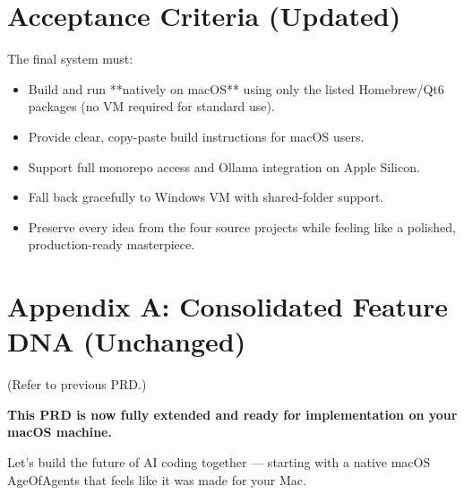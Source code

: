 \documentclass[11pt,a4paper]{article}
\begin{document}
\section{Acceptance Criteria (Updated)}

The final system must:
\begin{itemize}
    \item Build and run **natively on macOS** using only the listed Homebrew/Qt6 packages (no VM required for standard use).
    \item Provide clear, copy-paste build instructions for macOS users.
    \item Support full monorepo access and Ollama integration on Apple Silicon.
    \item Fall back gracefully to Windows VM with shared-folder support.
    \item Preserve every idea from the four source projects while feeling like a polished, production-ready masterpiece.
\end{itemize}

\newpage
\section{Appendix A: Consolidated Feature DNA (Unchanged)}

(Refer to previous PRD.)

\textbf{This PRD is now fully extended and ready for implementation on your macOS machine.}

Let's build the future of AI coding together — starting with a native macOS AgeOfAgents that feels like it was made for your Mac.
\end{document}
